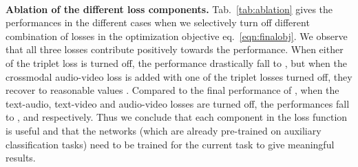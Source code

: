 \vspace{0.5em} \\
\textbf{Ablation of the different loss components.} Tab.~\ref{tab:ablation} gives the performances in the different cases when we selectively turn off different combination of losses in the optimization objective eq.~\ref{eqn:finalobj}. We observe that all three losses contribute positively towards the performance. When either of the triplet loss is turned off, the performance drastically fall to , but when the crossmodal audio-video loss is added with one of the triplet losses turned off, they recover to reasonable values . Compared to the final performance of , when the text-audio, text-video and audio-video losses are turned off, the performances fall to ,  and  respectively. Thus we conclude that each component in the loss function is useful and that the networks (which are already pre-trained on auxiliary classification tasks) need to be trained for the current task to give meaningful results.

 
 

